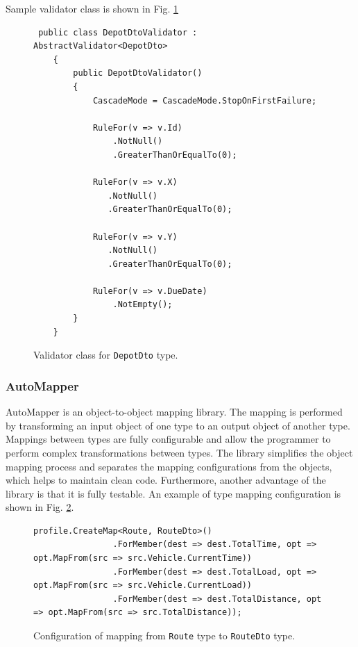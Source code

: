 \documentclass[a4paper,twoside,12pt]{book}
\begin{document}
Sample validator class is shown in Fig. \ref{fig:validator}

\begin{figure}
\centering
\begin{lstlisting}
 public class DepotDtoValidator : AbstractValidator<DepotDto>
    {
        public DepotDtoValidator()
        {
            CascadeMode = CascadeMode.StopOnFirstFailure;

            RuleFor(v => v.Id)
                .NotNull()
                .GreaterThanOrEqualTo(0);

            RuleFor(v => v.X)
               .NotNull()
               .GreaterThanOrEqualTo(0);

            RuleFor(v => v.Y)
               .NotNull()
               .GreaterThanOrEqualTo(0);

            RuleFor(v => v.DueDate)
                .NotEmpty();
        }
    }
\end{lstlisting}
\caption{Validator class for \lstinline|DepotDto| type.}
\label{fig:validator}
\end{figure}

\subsubsection{AutoMapper}
AutoMapper is an object-to-object mapping library. The mapping is performed by transforming an input object of one type to an output object of another type. Mappings between types are fully configurable and allow the programmer to perform complex transformations between types. 
The library simplifies the object mapping process and separates the mapping configurations from the objects, which helps to maintain clean code. Furthermore, another advantage of the library is that it is fully testable.
An example of type mapping configuration is shown in Fig. \ref{fig:autoMapper}.

\begin{figure}
\centering
\begin{lstlisting}
profile.CreateMap<Route, RouteDto>()
                .ForMember(dest => dest.TotalTime, opt => opt.MapFrom(src => src.Vehicle.CurrentTime))
                .ForMember(dest => dest.TotalLoad, opt => opt.MapFrom(src => src.Vehicle.CurrentLoad))
                .ForMember(dest => dest.TotalDistance, opt => opt.MapFrom(src => src.TotalDistance));
\end{lstlisting}
\caption{Configuration of mapping from \lstinline|Route| type to \lstinline|RouteDto| type.}
\label{fig:autoMapper}
\end{figure}
\end{document}
